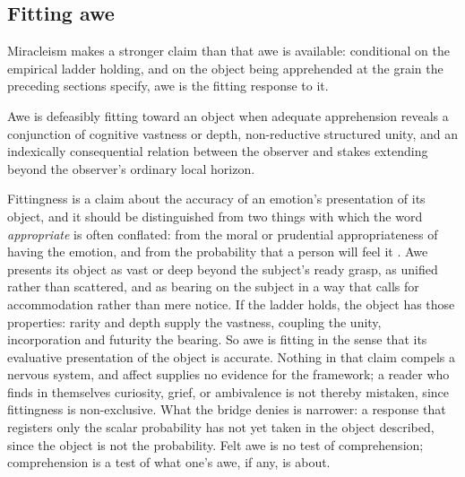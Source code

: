 \subsection*{Fitting awe}

Miracleism makes a stronger claim than that awe is available: conditional on
the empirical ladder holding, and on the object being apprehended at the grain
the preceding sections specify, awe is the fitting response to it.

\begin{premise}\label{prem:awe}
Awe is defeasibly fitting toward an object when adequate apprehension
reveals a conjunction of cognitive vastness or depth, non-reductive
structured unity, and an indexically consequential relation between the
observer and stakes extending beyond the observer's ordinary local
horizon.
\end{premise}

\noindent Fittingness is a claim about the accuracy of an emotion's
presentation of its object, and it should be distinguished from two things
with which the word \emph{appropriate} is often conflated: from the moral or
prudential appropriateness of having the emotion, and from the probability
that a person will feel it \cite{DArmsJacobson00}. Awe presents its object as
vast or deep beyond the subject's ready grasp, as unified rather than
scattered, and as bearing on the subject in a way that calls for accommodation
rather than mere notice. If the ladder holds, the object has those properties:
rarity and depth supply the vastness, coupling the unity, incorporation and
futurity the bearing. So awe is fitting in the sense that its evaluative
presentation of the object is accurate. Nothing in that claim compels a
nervous system, and affect supplies no evidence for the framework; a reader
who finds in themselves curiosity, grief, or ambivalence is not thereby
mistaken, since fittingness is non-exclusive. What the bridge denies is narrower: a response that registers only
the scalar probability has not yet taken in the object described, since the
object is not the probability. Felt awe is no test of comprehension;
comprehension is a test of what one's awe, if any, is about.

